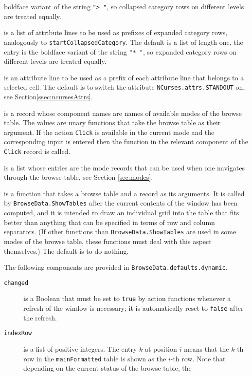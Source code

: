 \documentclass[a4paper,11pt]{report}
\begin{document}
{{{\begin{description}
boldface variant of the string \texttt{"{\textgreater} "}, so collapsed category rows on different levels are treated equally. 
\item[{\texttt{startExpandedCategory}}]  is a list of attribute lines to be used as prefixes of expanded category rows,
analogously to \texttt{startCollapsedCategory}. The default is a list of length one, the entry is the boldface variant of
the string \texttt{"* "}, so expanded category rows on different levels are treated equally. 
\item[{\texttt{startSelect}}]  is an attribute line to be used as a prefix of each attribute line that
belongs to a selected cell. The default is to switch the attribute \texttt{NCurses.attrs.STANDOUT} on, see Section{\nobreakspace}\ref{ssec:ncursesAttrs}. 
\item[{\texttt{Click}}]  is a record whose component names are names of available modes of the browse
table. The values are unary functions that take the browse table as their
argument. If the action \texttt{Click} is available in the current mode and the corresponding input is entered then
the function in the relevant component of the \texttt{Click} record is called. 
\item[{\texttt{availableModes}}]  is a list whose entries are the mode records that can be used when one
navigates through the browse table, see Section \ref{sec:modes}. 
\item[{\texttt{SpecialGrid}}]  is a function that takes a browse table and a record as its arguments. It is
called by \texttt{BrowseData.ShowTables} after the current contents of the window has been computed, and it is intended
to draw an individual grid into the table that fits better than anything that
can be specified in terms of row and column separators. (If other functions
than \texttt{BrowseData.ShowTables} are used in some modes of the browse table, these functions must deal with
this aspect themselves.) The default is to do nothing. 
\end{description}
  The following components are provided in \texttt{BrowseData.defaults.dynamic}. 
\begin{description}
\item[{\texttt{changed}}]  is a Boolean that must be set to \texttt{true} by action functions whenever a refresh of the window is necessary; it is
automatically reset to \texttt{false} after the refresh. 
\item[{\texttt{indexRow}}]  is a list of positive integers. The entry $k$ at position $i$ means that the $k$-th row in the \texttt{mainFormatted} table is shown as the $i$-th row. Note that depending on the current status of the browse table, the

\end{description}}}}
\end{document}
